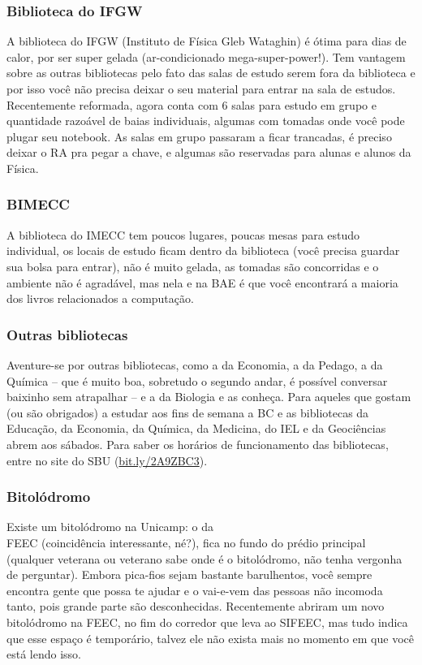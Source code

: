 \subsubsection{Biblioteca do IFGW}

A biblioteca do IFGW (Instituto de Física Gleb Wataghin) é ótima para dias de
calor, por ser super gelada (ar-condicionado mega-super-power!). Tem vantagem
sobre as outras bibliotecas pelo fato das salas de estudo serem fora da
biblioteca e por isso você não precisa deixar o seu material para entrar na
sala de estudos. Recentemente reformada, agora conta com 6 salas para estudo em
grupo e quantidade razoável de baias individuais, algumas com tomadas onde você
pode plugar seu notebook. As salas em grupo passaram a ficar trancadas, é
preciso deixar o RA pra pegar a chave, e algumas são reservadas para alunas e
alunos da Física.

\subsubsection{BIMECC}

A biblioteca do IMECC tem poucos lugares, poucas mesas para estudo individual,
os locais de estudo ficam dentro da biblioteca (você precisa guardar sua bolsa
para entrar), não é muito gelada, as tomadas são concorridas e o ambiente não é
agradável, mas nela e na BAE é que você encontrará a maioria dos livros
relacionados a computação.

\subsubsection{Outras bibliotecas}

Aventure-se por outras bibliotecas, como a da Economia, a da Pedago, a da
Química -- que é muito boa, sobretudo o segundo andar, é possível conversar
baixinho sem atrapalhar -- e a da Biologia e as conheça. Para aqueles que
gostam (ou são obrigados) a estudar aos fins de semana a BC e as bibliotecas da
Educação, da Economia, da Química, da Medicina, do IEL e da Geociências abrem
aos sábados. Para saber os horários de funcionamento das bibliotecas, entre no
site do SBU (\url{bit.ly/2A9ZBC3}).

\subsubsection{Bitolódromo}

Existe um bitolódromo na Unicamp: o da\\FEEC (coincidência interessante, né?),
fica no fundo do prédio principal (qualquer veterana ou veterano sabe onde é o
bitolódromo, não tenha vergonha de perguntar). Embora pica-fios sejam bastante
barulhentos, você sempre encontra gente que possa te ajudar e o vai-e-vem das
pessoas não incomoda tanto, pois grande parte são desconhecidas. Recentemente
abriram um novo bitolódromo na FEEC, no fim do corredor que leva ao SIFEEC, mas
tudo indica que esse espaço é temporário, talvez ele não exista mais no momento
em que você está lendo isso.


